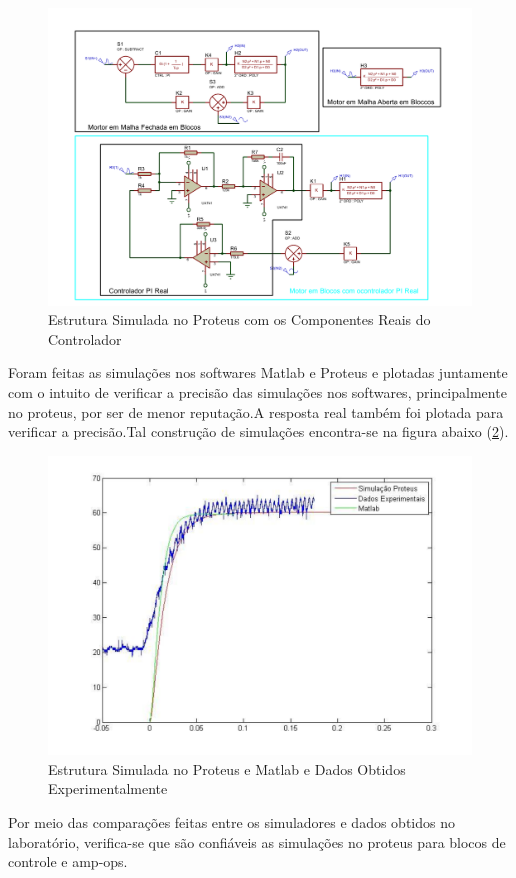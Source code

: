 \documentclass{Fabiano_file}
\begin{document}
{\begin{figure}[h!]
\centering
\includegraphics[width=.9\textwidth]{circuito_proteus.pdf}
\caption{Estrutura Simulada no Proteus com os Componentes Reais do Controlador}
\label{Circ_proteus}
\end{figure}

Foram feitas as simulações nos softwares Matlab e Proteus e plotadas juntamente com o intuito de verificar a precisão das simulações nos softwares, 
principalmente no proteus, por ser de menor reputação.A resposta real também foi plotada para verificar a precisão.Tal construção de simulações encontra-se 
na figura abaixo (\ref{sim_pro_mat}).


\begin{figure}[h!]
\centering
\includegraphics[width=.7\textwidth]{Comparacao_mat_pro_real_m_fechada.pdf}
\caption{Estrutura Simulada no Proteus e Matlab e Dados Obtidos Experimentalmente}
\label{sim_pro_mat}
\end{figure}

Por meio das comparações feitas entre os simuladores e dados obtidos no laboratório, verifica-se que são confiáveis as simulações no proteus para blocos de 
controle e amp-ops.

}
\end{document}
